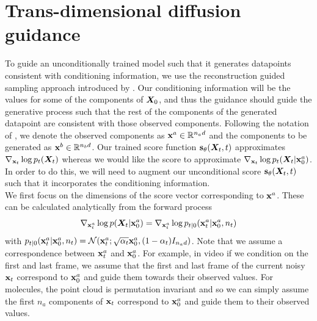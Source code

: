 \section{Trans-dimensional diffusion guidance}
\label{sec:tddm-ApdxDiffGuide}

To guide an unconditionally trained model such that it generates datapoints consistent with conditioning information, we use the reconstruction guided sampling approach introduced by \citet{ho2022video}. Our conditioning information will be the values for some of the components of ${\bm{X}}_0$, and thus the guidance should guide the generative process such that the rest of the components of the generated datapoint are consistent with those observed components. Following the notation of \citet{ho2022video}, we denote the observed components as ${\mathbf{x}}^a \in \mathbb{R}^{n_a d}$ and the components to be generated as ${\mathbf{x}}^b \in \mathbb{R}^{n_b d}$. Our trained score function ${\mathbf{s}}_\theta({\bm{X}}_t, t)$ approximates $\nabla_{{\mathbf{x}}_t} \log p_t({\bm{X}}_t)$ whereas we would like the score to approximate $\nabla_{{\mathbf{x}}_t} \log p_t({\bm{X}}_t | {\mathbf{x}}_0^a)$. In order to do this, we will need to augment our unconditional score ${\mathbf{s}}_\theta({\bm{X}}_t, t)$ such that it incorporates the conditioning information.\\

We first focus on the dimensions of the score vector corresponding to ${\mathbf{x}}^a$. These can be calculated analytically from the forward process
\begin{equation}
    \nabla_{{\mathbf{x}}_t^a} \log p({\bm{X}}_t | {\mathbf{x}}_0^a) = \nabla_{{\mathbf{x}}_t^a} \log p_{t|0}({\mathbf{x}}_t^a | {\mathbf{x}}_0^a, n_t)
\end{equation}
with $p_{t|0}({\mathbf{x}}_t^a | {\mathbf{x}}_0^a, n_t) = \mathcal{N}({\mathbf{x}}_t^a; \sqrt{\alpha_t} {\mathbf{x}}_0^a, (1 - \alpha_t) I_{n_a d})$. Note that we assume a correspondence between ${\mathbf{x}}_t^a$ and ${\mathbf{x}}_0^a$. For example, in video if we condition on the first and last frame, we assume that the first and last frame of the current noisy ${\mathbf{x}}_t$ correspond to ${\mathbf{x}}_0^a$ and guide them towards their observed values. For molecules, the point cloud is permutation invariant and so we can simply assume the first $n_a$ components of ${\mathbf{x}}_t$ correspond to ${\mathbf{x}}_0^a$ and guide them to their observed values.\\

